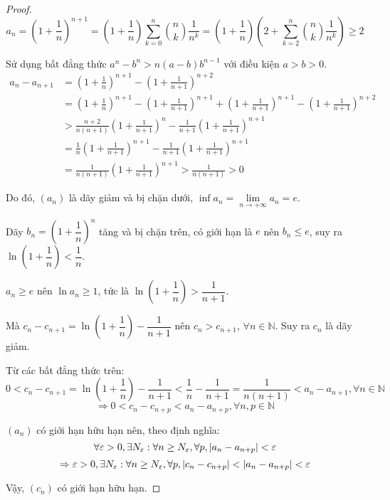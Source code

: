 \documentclass[class=analysis,crop=false]{standalone}
\begin{document}
\begin{proof}
    \[
        a_{n} = \left(1 + \frac{1}{n}\right)^{n+1} = \left(1 + \frac{1}{n}\right)\sum^{n}_{k=0}\binom{n}{k}\frac{1}{n^{k}} = \left(1 + \frac{1}{n}\right)\left(2 + \sum^{n}_{k=2}\binom{n}{k}\frac{1}{n^{k}}\right) \ge 2
    \]
    \par Sử dụng bất đẳng thức $a^{n} - b^{n} > n(a-b)b^{n-1}$ với điều kiện $a > b > 0$.
    \begin{align*}
        a_{n} - a_{n+1} & = \left(1 + \frac{1}{n}\right)^{n+1} - \left(1 + \frac{1}{n+1}\right)^{n+2}                                                                               \\
                        & = \left(1 + \frac{1}{n}\right)^{n+1} - \left(1 + \frac{1}{n+1}\right)^{n+1} + \left(1 + \frac{1}{n+1}\right)^{n+1} - \left(1 + \frac{1}{n+1}\right)^{n+2} \\
                        & > \frac{n+2}{n(n+1)}\left(1 + \frac{1}{n+1}\right)^{n} - \frac{1}{n+1}\left(1 + \frac{1}{n+1}\right)^{n+1}                                                \\
                        & = \frac{1}{n}\left(1 + \frac{1}{n+1}\right)^{n+1} - \frac{1}{n+1}\left(1 + \frac{1}{n+1}\right)^{n+1}                                                     \\
                        & = \frac{1}{n(n+1)}\left(1 + \frac{1}{n+1}\right)^{n+1} > \frac{1}{n(n+1)} > 0
    \end{align*}
    \par Do đó, $(a_{n})$ là dãy giảm và bị chặn dưới, $\inf a_{n} = \lim\limits_{n\to+\infty}a_{n} = e$.
    \par Dãy $b_{n} = \left(1 + \dfrac{1}{n}\right)^{n}$ tăng và bị chặn trên, có giới hạn là $e$ nên $b_{n} \le e$, suy ra $\ln\left(1 + \dfrac{1}{n}\right) < \dfrac{1}{n}$.
    \par $a_{n} \ge e$ nên $\ln a_{n} \ge 1$, tức là $\ln\left(1 + \dfrac{1}{n}\right) > \dfrac{1}{n+1}$.
    \par Mà $c_{n} - c_{n+1} = \ln\left(1 + \dfrac{1}{n}\right) - \dfrac{1}{n+1}$ nên $c_{n} > c_{n+1}$, $\forall n\in\mathbb{N}$. Suy ra $c_{n}$ là dãy giảm.
    \bigskip
    \par Từ các bất đẳng thức trên:
    \[
        0 < c_{n} - c_{n+1} = \ln\left(1 + \frac{1}{n}\right) - \frac{1}{n+1} < \frac{1}{n} - \frac{1}{n+1} = \frac{1}{n(n+1)} < a_{n} - a_{n+1}, \forall n\in\mathbb{N}
    \]
    \[
        \Longrightarrow 0 < c_{n} - c_{n+p} < a_{n} - a_{n+p}, \forall n, p\in\mathbb{N}
    \]
    \par $(a_{n})$ có giới hạn hữu hạn nên, theo định nghĩa:
    \[
        \forall\varepsilon > 0, \exists N_{\varepsilon}: \forall n\ge N_{\varepsilon},\forall p, \left\vert{a_{n} - a_{n+p}}\right\vert < \varepsilon
    \]
    \[
        \Rightarrow\varepsilon > 0, \exists N_{\varepsilon}: \forall n\ge N_{\varepsilon},\forall p, \left\vert{c_{n} - c_{n+p}}\right\vert < \left\vert{a_{n} - a_{n+p}}\right\vert < \varepsilon
    \]
    \par Vậy, $(c_{n})$ có giới hạn hữu hạn.
\end{proof}
\end{document}
